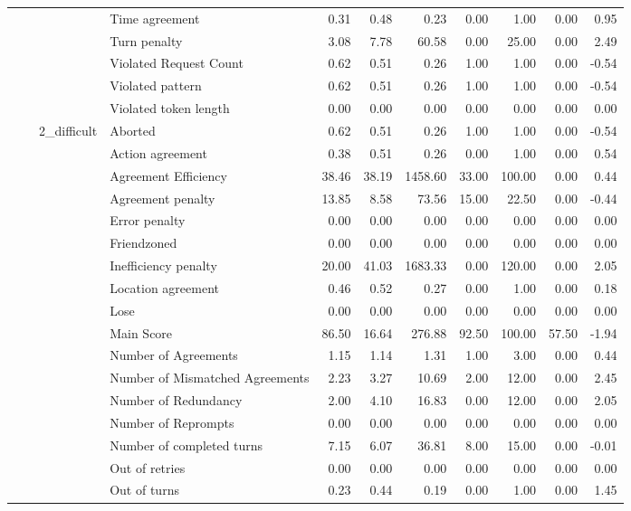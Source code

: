 \begin{tabular}{llllrrrrrrr}
 &  &  & Time agreement & 0.31 & 0.48 & 0.23 & 0.00 & 1.00 & 0.00 & 0.95 \\
 &  &  & Turn penalty & 3.08 & 7.78 & 60.58 & 0.00 & 25.00 & 0.00 & 2.49 \\
 &  &  & Violated Request Count & 0.62 & 0.51 & 0.26 & 1.00 & 1.00 & 0.00 & -0.54 \\
 &  &  & Violated pattern & 0.62 & 0.51 & 0.26 & 1.00 & 1.00 & 0.00 & -0.54 \\
 &  &  & Violated token length & 0.00 & 0.00 & 0.00 & 0.00 & 0.00 & 0.00 & 0.00 \\
\cline{3-11}
 &  & \multirow[t]{27}{*}{2_difficult} & Aborted & 0.62 & 0.51 & 0.26 & 1.00 & 1.00 & 0.00 & -0.54 \\
 &  &  & Action agreement & 0.38 & 0.51 & 0.26 & 0.00 & 1.00 & 0.00 & 0.54 \\
 &  &  & Agreement Efficiency & 38.46 & 38.19 & 1458.60 & 33.00 & 100.00 & 0.00 & 0.44 \\
 &  &  & Agreement penalty & 13.85 & 8.58 & 73.56 & 15.00 & 22.50 & 0.00 & -0.44 \\
 &  &  & Error penalty & 0.00 & 0.00 & 0.00 & 0.00 & 0.00 & 0.00 & 0.00 \\
 &  &  & Friendzoned & 0.00 & 0.00 & 0.00 & 0.00 & 0.00 & 0.00 & 0.00 \\
 &  &  & Inefficiency penalty & 20.00 & 41.03 & 1683.33 & 0.00 & 120.00 & 0.00 & 2.05 \\
 &  &  & Location agreement & 0.46 & 0.52 & 0.27 & 0.00 & 1.00 & 0.00 & 0.18 \\
 &  &  & Lose & 0.00 & 0.00 & 0.00 & 0.00 & 0.00 & 0.00 & 0.00 \\
 &  &  & Main Score & 86.50 & 16.64 & 276.88 & 92.50 & 100.00 & 57.50 & -1.94 \\
 &  &  & Number of Agreements & 1.15 & 1.14 & 1.31 & 1.00 & 3.00 & 0.00 & 0.44 \\
 &  &  & Number of Mismatched Agreements & 2.23 & 3.27 & 10.69 & 2.00 & 12.00 & 0.00 & 2.45 \\
 &  &  & Number of Redundancy & 2.00 & 4.10 & 16.83 & 0.00 & 12.00 & 0.00 & 2.05 \\
 &  &  & Number of Reprompts & 0.00 & 0.00 & 0.00 & 0.00 & 0.00 & 0.00 & 0.00 \\
 &  &  & Number of completed turns & 7.15 & 6.07 & 36.81 & 8.00 & 15.00 & 0.00 & -0.01 \\
 &  &  & Out of retries & 0.00 & 0.00 & 0.00 & 0.00 & 0.00 & 0.00 & 0.00 \\
 &  &  & Out of turns & 0.23 & 0.44 & 0.19 & 0.00 & 1.00 & 0.00 & 1.45 \\

\end{tabular}
